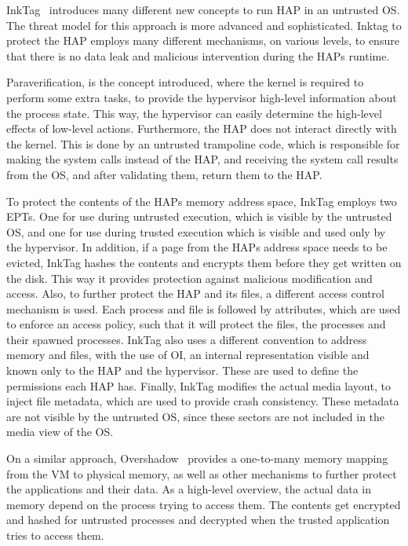 \par InkTag~\cite{hofmann2013inktag} introduces many different new concepts to run \ac{HAP} in an untrusted \ac{OS}. The threat model for this approach is more advanced and sophisticated. Inktag to protect the \ac{HAP} employs many different mechanisms, on various levels, to ensure that there is no data leak and malicious intervention during the \ac{HAP}s runtime. 
\par Paraverification, is the concept introduced, where the kernel is required to perform some extra tasks, to provide the hypervisor high-level information about the process state. This way, the hypervisor can easily determine the high-level effects of low-level actions. Furthermore, the \ac{HAP} does not interact directly with the kernel. This is done by an untrusted trampoline code, which is responsible for making the system calls instead of the \ac{HAP}, and receiving the system call results from the \ac{OS}, and after validating them, return them to the \ac{HAP}.
\par To protect the contents of the \ac{HAP}s memory address space, InkTag employs two \ac{EPT}s. One for use during untrusted execution, which is visible by the untrusted \ac{OS}, and one for use during trusted execution which is visible and used only by the hypervisor. In addition, if a page from the \ac{HAP}s address space needs to be evicted, InkTag hashes the contents and encrypts them before they get written on the disk. This way it provides protection against malicious modification and access.
Also, to further protect the \ac{HAP} and its files, a different access control mechanism is used. Each process and file is followed by attributes, which are used to enforce an access policy, such that it will protect the files, the processes and their spawned processes. InkTag also uses a different convention to address memory and files, with the use of \ac{OI}, an internal representation visible and known only to the \ac{HAP} and the hypervisor. These are used to define the permissions each \ac{HAP} has.
Finally, InkTag modifies the actual media layout, to inject file metadata, which are used to provide crash consistency. These metadata are not visible by the untrusted \ac{OS}, since these sectors are not included in the media view of the \ac{OS}. 

\par On a similar approach, Overshadow~\cite{chen2008overshadow} provides a one-to-many memory mapping from the \ac{VM} to physical memory, as well as other mechanisms to further protect the applications and their data. As a high-level overview, the actual data in memory depend on the process trying to access them. The contents get encrypted and hashed for untrusted processes and decrypted when the trusted application tries to access them. 


